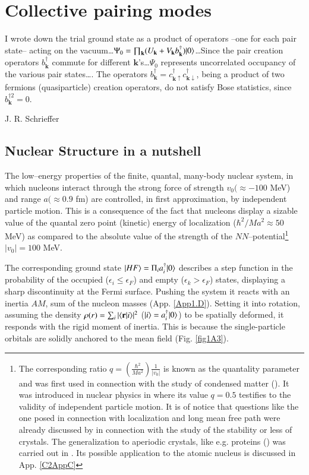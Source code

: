 \chapter{Collective pairing modes}\label{chapter1}
\epigraph{I wrote down the trial ground state as a product of operators --one for each pair state-- acting on the vacuum\dots \mbox{$\Psi_0=\prod_{\mathbf k}(U_{\mathbf k}+V_{\mathbf k}b^\dagger_{\mathbf k})|{0} \rangle$}\dots Since the pair creation operators $b^\dagger_{\mathbf k}$ commute for different $\mathbf k$'s\dots $\Psi_0$ represents uncorrelated occupancy of the various pair states\dots. The operators $b^\dagger_{\mathbf k}=c^\dagger_{\mathbf k\uparrow}c^\dagger_{\mathbf k\downarrow}$, being a product of two fermions (quasiparticle) creation operators, do not satisfy Bose statistics, since $b^{\dagger 2}_{\mathbf k}=0$.}{J. R. Schrieffer}
\section{Nuclear Structure in a nutshell}\label{C1S1}
The low--energy properties of the finite, quantal, many-body nuclear system, in which nucleons interact through the strong force of strength $v_0(\approx -100$ MeV) and range $a(\approx 0.9$ fm) are controlled, in first approximation, by independent particle motion. This is a consequence of the fact that nucleons display a sizable value of the quantal zero point (kinetic) energy of localization ($\hbar^2/Ma^2\approx 50$ MeV) as compared to the absolute value of the strength of the $NN$--potential\footnote{\label{f1C3} The corresponding ratio $q=\left(\frac{\hbar^2}{Ma^2}\right)\frac{1}{|v_0|}$ is known as the quantality parameter and was first used in connection with the study of condensed matter (\cite{deBoer:48,deBoer:57,deBoer:48b,Nosanow:76}). It  was introduced in nuclear physics in \cite{Mottelson:02} where its value $q=0.5$ testifies to the validity of independent particle motion. It is of notice that questions like the one posed in connection with localization and long mean free path were already discussed by \cite{Lindemann:10} in connection with the study of the stability or less of crystals. The generalization to aperiodic crystals, like e.g. proteins (\cite{Schrodinger:44}) was carried out in \cite{Stillinger:90}. Its possible application to the atomic nucleus is discussed in App. \ref{C2AppC} } $|v_0|=100$ MeV. 

The corresponding ground state $|{HF} \rangle=\Pi_ia^\dagger_i|{0} \rangle$ describes a step function in the probability of the occupied ($\epsilon_i\leq \epsilon_F$) and empty ($\epsilon_k>\epsilon_F$) states, displaying a sharp discontinuity at the Fermi surface. Pushing the system it reacts with an inertia $AM$, sum of the nucleon masses (App. \ref{App1.D}). Setting it into rotation, assuming the density $\rho(r)=\sum_i|\langle {\mathbf r|i} \rangle|^2$ ($|{i} \rangle=a^\dagger_i|{0} \rangle$) to be spatially deformed, it responds with the rigid moment of inertia. This is because the single-particle orbitals are solidly anchored to the mean field (Fig. \ref{fig1A3}).

